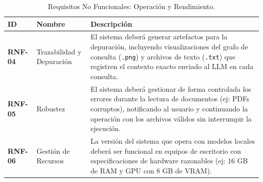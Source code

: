 \begin{table}[H]
\centering
\renewcommand{\arraystretch}{1.4}
\caption{Requisitos No Funcionales: Operación y Rendimiento.}
\label{tab:rnf_operacion}
\begin{tabularx}{\textwidth}{|l|l|X|}
\hline
\textbf{ID} & \textbf{Nombre} & \textbf{Descripción} \\
\hline
\textbf{RNF-04} & Trazabilidad y Depuración & El sistema deberá generar artefactos para la depuración, incluyendo visualizaciones del grafo de consulta (\texttt{.png}) y archivos de texto (\texttt{.txt}) que registren el contexto exacto enviado al LLM en cada consulta. \\
\hline
\textbf{RNF-05} & Robustez & El sistema deberá gestionar de forma controlada los errores durante la lectura de documentos (ej: PDFs corruptos), notificando al usuario y continuando la operación con los archivos válidos sin interrumpir la ejecución. \\
\hline
\textbf{RNF-06} & Gestión de Recursos & La versión del sistema que opera con modelos locales deberá ser funcional en equipos de escritorio con especificaciones de hardware razonables (ej: 16 GB de RAM y GPU con 8 GB de VRAM). \\
\hline
\end{tabularx}
\end{table}
